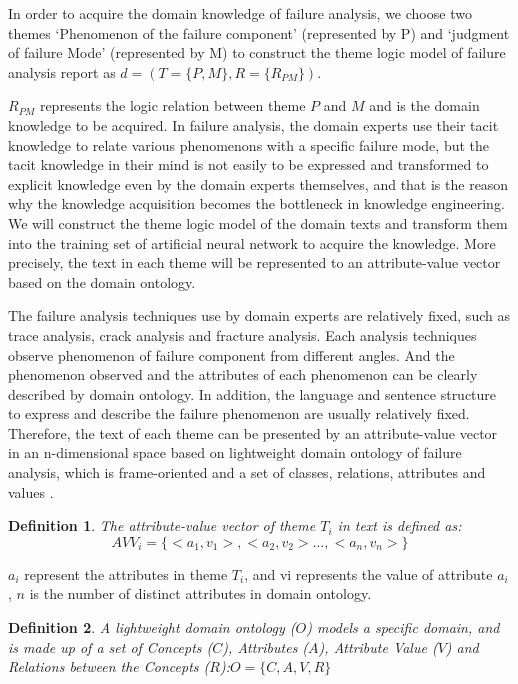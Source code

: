 \documentclass{elsarticle}
\newtheorem{definition}{Definition}
\begin{document}
In order to acquire the domain knowledge of failure analysis, we
choose two themes ‘Phenomenon of the failure component’ (represented
by P) and ‘judgment of failure Mode’ (represented by M) to construct
the theme logic model of failure analysis report as $d = (T = \{P,M\},
R = \{R_{PM}\})$.

$R_{PM}$ represents the logic relation between theme $P$ and $M$ and
is the domain knowledge to be acquired. In failure analysis, the
domain experts use their tacit knowledge to relate various phenomenons
with a specific failure mode, but the tacit knowledge in their mind is
not easily to be expressed and transformed to explicit knowledge even
by the domain experts themselves, and that is the reason why the
knowledge acquisition becomes the bottleneck in knowledge
engineering. We will construct the theme logic model of the domain
texts and transform them into the training set of artificial neural
network to acquire the knowledge. More precisely, the text in each
theme will be represented to an attribute-value vector based on the
domain ontology. 

The failure analysis techniques use by domain experts are relatively fixed, such as trace analysis, crack analysis and fracture analysis. Each analysis techniques observe phenomenon of failure component from different angles. And the phenomenon observed and the attributes of each phenomenon can be clearly described by domain ontology. In addition, the language and sentence structure to express and describe the failure phenomenon are usually relatively fixed. Therefore, the text of each theme can be presented by an attribute-value vector in an n-dimensional space based on lightweight domain ontology of failure analysis, which is frame-oriented and a set of classes, relations, attributes and values \cite{747902}.

\begin{definition}
  The attribute-value vector of theme $T_i$ in text is defined as:
\[AVV_i = \{<a_1,v_1>,<a_2,v_2> \ldots,<a_n,v_n>\} \]
\end{definition}
$a_i$ represent the attributes in theme $T_i$, and vi represents the value of attribute $a_i$ , $n$ is the number of distinct attributes in domain ontology.

\begin{definition}
  A lightweight domain ontology ($O$) models a specific domain, and is
  made up of a set of Concepts ($C$), Attributes ($A$), Attribute
  Value ($V$) and Relations between the Concepts ($R$):$O = \{C,A,V,R\}$


\end{definition}
\end{document}
